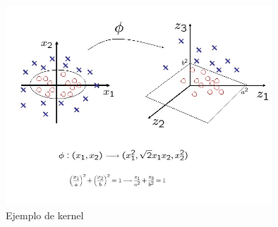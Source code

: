 \begin{figure}[ht!]
\centering
\includegraphics[width=100mm]{img/ejemplo.jpg}
\caption{Ejemplo de kernel}
\label{ejemplo}
\end{figure}
